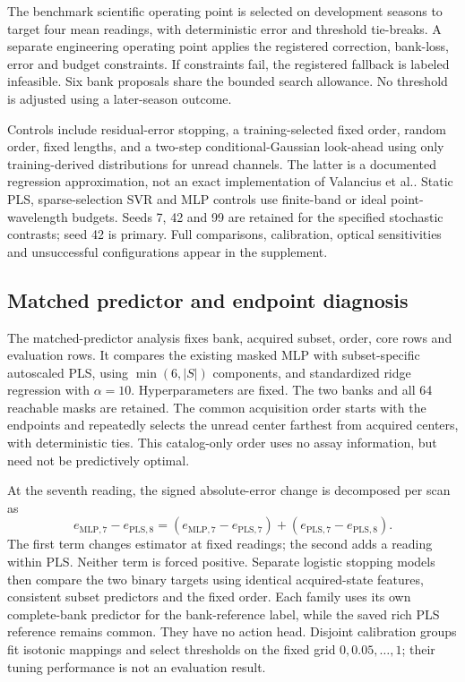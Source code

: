 \documentclass[Review,sagev,times]{sagej}
\begin{document}
The benchmark scientific operating point is selected on development seasons to target four mean readings, with deterministic error and threshold tie-breaks. A separate engineering operating point applies the registered correction, bank-loss, error and budget constraints. If constraints fail, the registered fallback is labeled infeasible. Six bank proposals share the bounded search allowance. No threshold is adjusted using a later-season outcome.

Controls include residual-error stopping, a training-selected fixed order, random order, fixed lengths, and a two-step conditional-Gaussian look-ahead using only training-derived distributions for unread channels. The latter is a documented regression approximation, not an exact implementation of Valancius et al.\citep{valancius2024}. Static PLS, sparse-selection SVR and MLP controls use finite-band or ideal point-wavelength budgets. Seeds 7, 42 and 99 are retained for the specified stochastic contrasts; seed 42 is primary. Full comparisons, calibration, optical sensitivities and unsuccessful configurations appear in the supplement.

\subsection{Matched predictor and endpoint diagnosis}
The matched-predictor analysis fixes bank, acquired subset, order, core rows and evaluation rows. It compares the existing masked MLP with subset-specific autoscaled PLS, using $\min(6,|S|)$ components, and standardized ridge regression with $\alpha=10$. Hyperparameters are fixed. The two banks and all 64 reachable masks are retained. The common acquisition order starts with the endpoints and repeatedly selects the unread center farthest from acquired centers, with deterministic ties. This catalog-only order uses no assay information, but need not be predictively optimal.

At the seventh reading, the signed absolute-error change is decomposed per scan as
\begin{equation}
e_{\mathrm{MLP},7}-e_{\mathrm{PLS},8}
=\left(e_{\mathrm{MLP},7}-e_{\mathrm{PLS},7}\right)
+\left(e_{\mathrm{PLS},7}-e_{\mathrm{PLS},8}\right).
\end{equation}
The first term changes estimator at fixed readings; the second adds a reading within PLS. Neither term is forced positive. Separate logistic stopping models then compare the two binary targets using identical acquired-state features, consistent subset predictors and the fixed order. Each family uses its own complete-bank predictor for the bank-reference label, while the saved rich PLS reference remains common. They have no action head. Disjoint calibration groups fit isotonic mappings and select thresholds on the fixed grid $0,0.05,\ldots,1$; their tuning performance is not an evaluation result.
\end{document}
